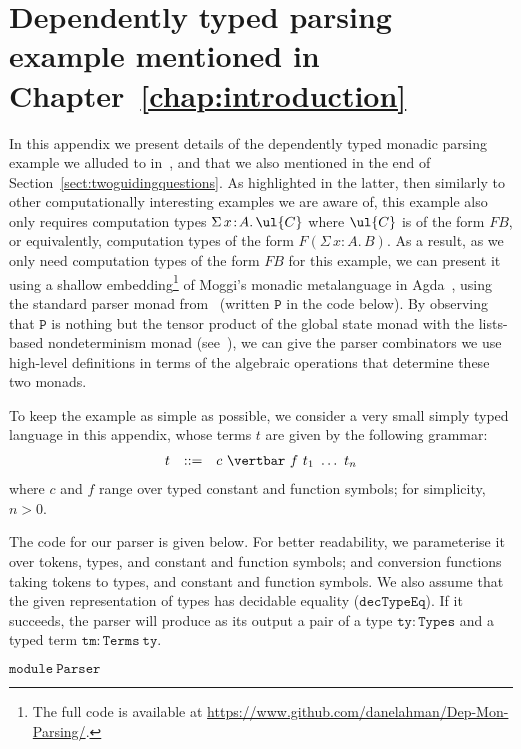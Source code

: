
\chapter{Dependently typed parsing example mentioned in Chapter~\ref{chap:introduction}}
\label{chap:appendixC1}

In this appendix we present details of the dependently typed monadic parsing example 
we alluded to in~\cite{Ahman:FibredEffects}, and that we also mentioned in the end of Section~\ref{sect:twoguidingquestions}.
As highlighted in the latter, then similarly to other computationally interesting  examples we are aware of, this example also only requires  
computation types $\Sigma\, x\!:\! A .\, \ul{C}$ where $\ul{C}$ is of the form $FB$, or equivalently, computation types of the form $F(\Sigma\, x \!:\! A .\, B)$.
%
As a result, as we only need computation types of the form $FB$ for this example, we can present it using a shallow embedding\footnote{The full code is available at 
\url{https://www.github.com/danelahman/Dep-Mon-Parsing/}.} of Moggi's monadic metalanguage in Agda~\cite{Norell:AgdaTutorial}, using the standard parser monad from~\cite{Hutton:MonParsing} (written $\mathtt{P}$ in the code below). By observing that $\mathtt{P}$ is nothing but the tensor product of the global state monad with the lists-based nondeterminism monad (see~\cite{Hyland:CombiningEffects}), we can give the parser combinators we use high-level definitions in terms of the algebraic operations that determine these two monads. 

To keep the example as simple as possible, we consider a very small simply typed language in this appendix, whose terms $t$ are given by the following grammar:
\[
\begin{array}{r c l}
t & ::= & c ~ \vertbar ~ f~t_1~\ldots~t_n
\end{array}
\]
where $c$ and $f$ range over typed constant and function symbols; for simplicity, $n > 0$.

The code for our parser is given below. For better readability, we parameterise it over tokens, types, and constant and function symbols; and conversion functions taking tokens to types, and constant and function symbols. We also assume that the given representation of types has decidable equality ($\mathtt{decTypeEq}$). If it succeeds, the parser will produce as its output a pair of a type $\mathtt{ty:Types}$ and a typed term $\mathtt{tm:Terms~ty}$.

\pagebreak

{\small{$\mathtt{module ~ Parser}$}}

